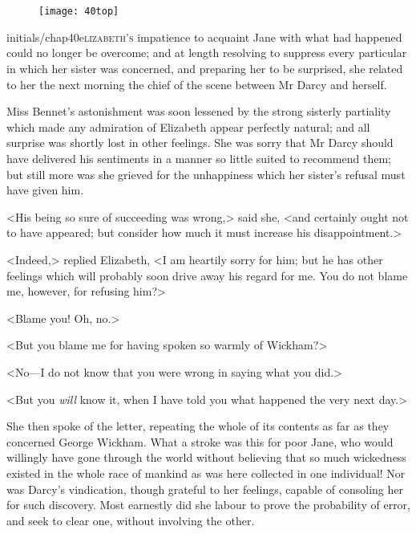 \chapter[Chapter \thechapter]{}
	
	
\begin{figure}[t!]
\centering
\texttt{[image: 40top]}
\end{figure}


\lettrine[lines=6,image=true]{initials/chap40e}{lizabeth's} impatience to acquaint Jane with what had happened could no longer be overcome; and at length resolving to suppress every particular in which her sister was concerned, and preparing her to be surprised, she related to her the next morning the chief of the scene between Mr Darcy and herself.

\zz
Miss Bennet's astonishment was soon lessened by the strong sisterly partiality which made any admiration of Elizabeth appear perfectly natural; and all surprise was shortly lost in other feelings. She was sorry that Mr Darcy should have delivered his sentiments in a manner so little suited to recommend them; but still more was she grieved for the unhappiness which her sister's refusal must have given him.

<His being so sure of succeeding was wrong,> said she, <and certainly ought not to have appeared; but consider how much it must increase his disappointment.>

<Indeed,> replied Elizabeth, <I am heartily sorry for him; but he has other feelings which will probably soon drive away his regard for me. You do not blame me, however, for refusing him?>

<Blame you! Oh, no.>

<But you blame me for having spoken so warmly of Wickham?>

<No—I do not know that you were wrong in saying what you did.>

<But you \textit{will} know it, when I have told you what happened the very next day.>

She then spoke of the letter, repeating the whole of its contents as far as they concerned George Wickham. What a stroke was this for poor Jane, who would willingly have gone through the world without believing that so much wickedness existed in the whole race of mankind as was here collected in one individual! Nor was Darcy's vindication, though grateful to her feelings, capable of consoling her for such discovery. Most earnestly did she labour to prove the probability of error, and seek to clear one, without involving the other.

